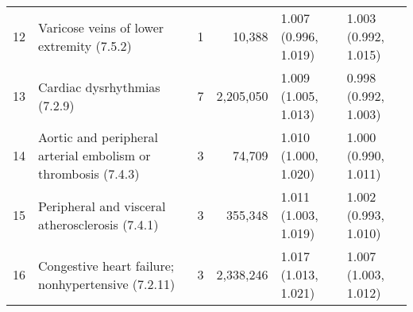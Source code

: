 \begin{tabular}{lp{6.5cm}rrp{2.2cm}p{2.2cm}}
    12 & Varicose veins of lower extremity (7.5.2) &    1 & 10,388 & 1.007 (0.996, 1.019) & 1.003 (0.992, 1.015) \\ 
    13 & Cardiac dysrhythmias (7.2.9) &    7 & 2,205,050 & 1.009 (1.005, 1.013) & 0.998 (0.992, 1.003) \\ 
    14 & Aortic and peripheral arterial embolism or thrombosis (7.4.3) &    3 & 74,709 & 1.010 (1.000, 1.020) & 1.000 (0.990, 1.011) \\ 
    15 & Peripheral and visceral atherosclerosis (7.4.1) &    3 & 355,348 & 1.011 (1.003, 1.019) & 1.002 (0.993, 1.010) \\ 
    16 & Congestive heart failure; nonhypertensive (7.2.11) &    3 & 2,338,246 & 1.017 (1.013, 1.021) & 1.007 (1.003, 1.012) \\ 
   \hline
\end{tabular}

